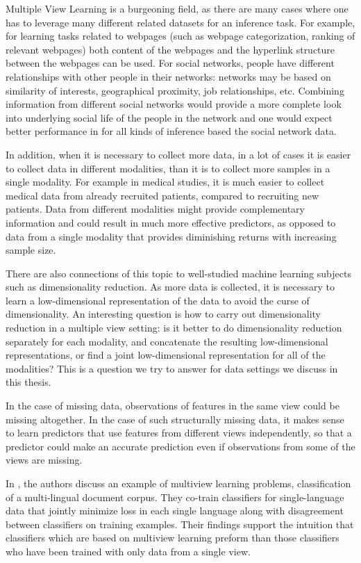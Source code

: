 \documentclass[12pt,oneside,final]{thesis}\usepackage[]{graphicx}\usepackage[]{color}
\begin{document}
 Multiple View Learning is a burgeoning field, as there are many cases where one has to leverage many different related datasets for an inference task. For example, for learning  tasks related to webpages (such as webpage categorization, ranking of relevant webpages) both content of the webpages and the hyperlink structure between the webpages can be used. For social networks, people have different relationships with other people in their networks: networks  may be based on similarity of interests, geographical proximity, job relationships, etc. Combining information from different social networks would provide a more complete look into underlying social life of the people in the network and one would expect better performance in for all kinds of  inference based the social network data.

In addition, when it is necessary to collect more data, in a lot of cases it is easier to collect data in different modalities, than it is to collect more samples in a single modality. For example in medical studies, it is much easier to  collect medical data from already recruited patients, compared to recruiting new patients. Data from different modalities might provide complementary information and could result in much more effective predictors, as opposed to data from a single modality that provides diminishing returns with increasing sample size.

There are  also connections of this topic to well-studied machine learning subjects such as dimensionality reduction. As more data is collected, it is necessary to learn a low-dimensional representation of the data to avoid the curse of dimensionality. An interesting question is how to carry out dimensionality reduction in a multiple view setting: is it better to do dimensionality reduction separately for each modality, and concatenate the resulting low-dimensional representations, or find a joint low-dimensional representation  for all of the modalities? This is a question we try to answer for data settings we discuss in this thesis.

In the case of missing data, observations of features in the same view could  be missing altogether. In the case of such structurally missing data, it makes sense to learn predictors that use features from different views independently, so that a predictor could make an accurate prediction even if observations from some of the views are missing.


In  \cite{Amini2009}, the authors  discuss  an example of multiview learning problems, classification of a multi-lingual document corpus. They  co-train  classifiers for single-language data that jointly minimize  loss in each single language along with disagreement between classifiers on training examples. Their findings support the intuition that  classifiers which are based on multiview learning preform than those classifiers who have been trained with only data from a single view.
\end{document}
